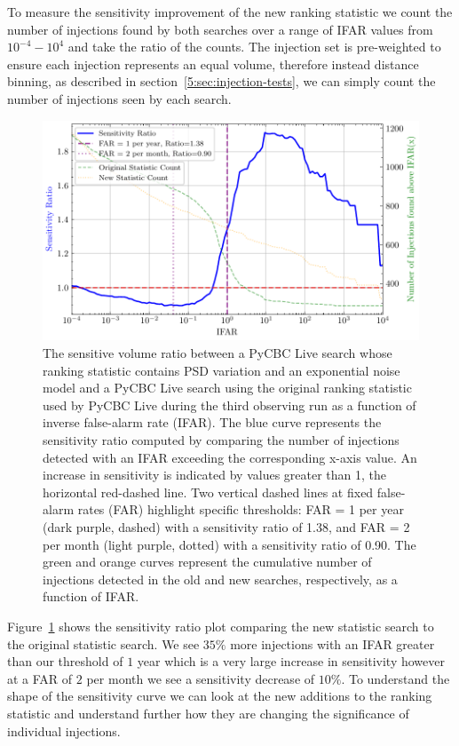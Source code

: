 To measure the sensitivity improvement of the new ranking statistic we count the number of injections found by both searches over a range of IFAR values from $10^{-4} - 10^{4}$ and take the ratio of the counts. The injection set is pre-weighted to ensure each injection represents an equal volume, therefore instead distance binning, as described in section~\ref{5:sec:injection-tests}, we can simply count the number of injections seen by each search.
%
\begin{figure}
  \centering
  \begin{minipage}[t]{1.0\linewidth}
  
    \includegraphics[width=1.0\textwidth]{images/5_pycbclive/fits-psd/fits_psd_vt_ratio_with_counts.pdf}
    \caption{The sensitive volume ratio between a PyCBC Live search whose ranking statistic contains PSD variation and an exponential noise model and a PyCBC Live search using the original ranking statistic used by PyCBC Live during the third observing run as a function of inverse false-alarm rate (IFAR). The blue curve represents the sensitivity ratio computed by comparing the number of injections detected with an IFAR exceeding the corresponding x-axis value. An increase in sensitivity is indicated by values greater than 1, the horizontal red-dashed line. Two vertical dashed lines at fixed false-alarm rates (FAR) highlight specific thresholds: FAR = 1 per year (dark purple, dashed) with a sensitivity ratio of 1.38, and FAR = 2 per month (light purple, dotted) with a sensitivity ratio of 0.90. The green and orange curves represent the cumulative number of injections detected in the old and new searches, respectively, as a function of IFAR.}
    \label{5:fig:fits-psdvar-sensitivity}

  \end{minipage}
\end{figure}
%
Figure~\ref{5:fig:fits-psdvar-sensitivity} shows the sensitivity ratio plot comparing the new statistic search to the original statistic search. We see $35\%$ more injections with an IFAR greater than our threshold of $1$ year which is a very large increase in sensitivity however at a FAR of $2$ per month we see a sensitivity decrease of $10\%$. To understand the shape of the sensitivity curve we can look at the new additions to the ranking statistic and understand further how they are changing the significance of individual injections.

